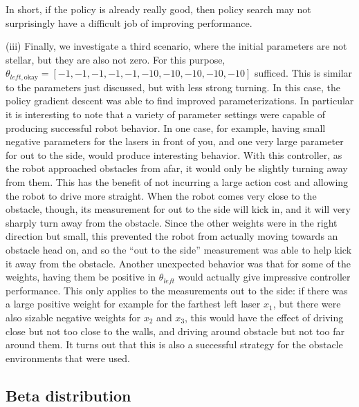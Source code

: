 \documentclass{article}
\begin{document}
In short, if the policy is already really good, then policy search may not surprisingly have a difficult job of improving performance.

(iii)  Finally, we investigate a third scenario, where the initial parameters are not stellar, but they are also not zero.  For this purpose, $\theta_{left, \text{okay}} = [-1, -1, -1, -1, -1, -10, -10, -10, -10, -10 ]$ sufficed.  This is similar to the parameters just discussed, but with less strong turning.  In this case, the policy gradient descent was able to find improved parameterizations.  In particular it is interesting to note that a variety of parameter settings were capable of producing successful robot behavior.  In one case, for example, having small negative parameters for the lasers in front of you, and one very large parameter for out to the side, would produce interesting behavior.  With this controller, as the robot approached obstacles from afar, it would only be slightly turning away from them.  This has the benefit of not incurring a large action cost and allowing the robot to drive more straight.  When the robot comes very close to the obstacle, though, its measurement for out to the side will kick in, and it will very sharply turn away from the obstacle.  Since the other weights were in the right direction but small, this prevented the robot from actually moving towards an obstacle head on, and so the ``out to the side'' measurement was able to help kick it away from the obstacle.  Another unexpected behavior was that for some of the weights, having them be positive in $\theta_{left}$ would actually give impressive controller performance.  This only applies to the measurements out to the side: if there was a large positive weight for example for the farthest left laser $x_1$, but there were also sizable negative weights for $x_2$ and $x_3$, this would have the effect of driving close but not too close to the walls, and driving around obstacle but not too far around them.  It turns out that this is also a successful strategy for the obstacle environments that were used.

\subsection{Beta distribution}
\end{document}
